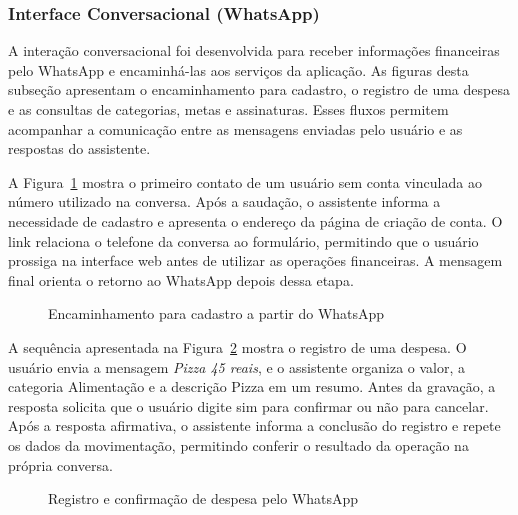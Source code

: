 \subsubsection{Interface Conversacional (WhatsApp)}

A interação conversacional foi desenvolvida para receber informações financeiras pelo WhatsApp e encaminhá-las aos serviços da aplicação. As figuras desta subseção apresentam o encaminhamento para cadastro, o registro de uma despesa e as consultas de categorias, metas e assinaturas. Esses fluxos permitem acompanhar a comunicação entre as mensagens enviadas pelo usuário e as respostas do assistente.

A Figura~\ref{fig:wa-cadastro} mostra o primeiro contato de um usuário sem conta vinculada ao número utilizado na conversa. Após a saudação, o assistente informa a necessidade de cadastro e apresenta o endereço da página de criação de conta. O link relaciona o telefone da conversa ao formulário, permitindo que o usuário prossiga na interface web antes de utilizar as operações financeiras. A mensagem final orienta o retorno ao WhatsApp depois dessa etapa.

\begin{figure}[H]
    \centering
    \setlength{\larguraPrint}{0.55\textwidth}
    \caption{Encaminhamento para cadastro a partir do WhatsApp}
    \label{fig:wa-cadastro}
\end{figure}

A sequência apresentada na Figura~\ref{fig:md-15} mostra o registro de uma despesa. O usuário envia a mensagem \textit{Pizza 45 reais}, e o assistente organiza o valor, a categoria Alimentação e a descrição Pizza em um resumo. Antes da gravação, a resposta solicita que o usuário digite sim para confirmar ou não para cancelar. Após a resposta afirmativa, o assistente informa a conclusão do registro e repete os dados da movimentação, permitindo conferir o resultado da operação na própria conversa.

\begin{figure}[H]
    \centering
    \setlength{\larguraPrint}{0.55\textwidth}
    \caption{Registro e confirmação de despesa pelo WhatsApp}
    \label{fig:md-15}
\end{figure}

